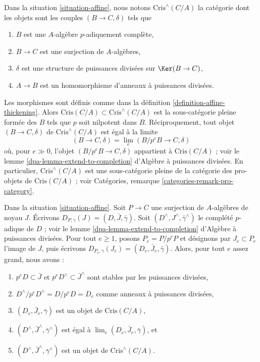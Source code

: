 \begin{remark}
\label{remark-completed-affine-site}
Dans la situation \ref{situation-affine}, nous notons
$\text{Cris}^\wedge(C/A)$ la catégorie dont les objets sont
les couples $(B \to C, \delta)$ tels que
\begin{enumerate}
\item $B$ est une $A$-algèbre $p$-adiquement complète,
\item $B \to C$ est une surjection de $A$-algèbres,
\item $\delta$ est une structure de puissances divisées sur $\Ker(B \to C)$,
\item $A \to B$ est un homomorphisme d'anneaux à puissances divisées.
\end{enumerate}
Les morphismes sont définis comme dans la définition \ref{definition-affine-thickening}.
Alors $\text{Cris}(C/A) \subset \text{Cris}^\wedge(C/A)$ est la sous-catégorie
pleine formée des $B$ tels que $p$ soit nilpotent dans $B$.
Réciproquement, tout objet $(B \to C, \delta)$ de $\text{Cris}^\wedge(C/A)$
est égal à la limite
$$
(B \to C, \delta) = \lim_e (B/p^eB \to C, \delta)
$$
où, pour $e \gg 0$, l'objet $(B/p^eB \to C, \delta)$ appartient
à $\text{Cris}(C/A)$ ; voir le
lemme \ref{dpa-lemma-extend-to-completion} d'Algèbre à puissances divisées.
En particulier, $\text{Cris}^\wedge(C/A)$ est une sous-catégorie pleine
de la catégorie des pro-objets de $\text{Cris}(C/A)$ ; voir
Catégories, remarque \ref{categories-remark-pro-category}.
\end{remark}

\begin{lemma}
\label{lemma-list-properties}
Dans la situation \ref{situation-affine}.
Soit $P \to C$ une surjection de $A$-algèbres de noyau $J$.
Écrivons $D_{P, \gamma}(J) = (D, \bar J, \bar\gamma)$.
Soit $(D^\wedge, J^\wedge, \bar\gamma^\wedge)$ le
complété $p$-adique de $D$ ; voir le
lemme \ref{dpa-lemma-extend-to-completion} d'Algèbre à puissances divisées.
Pour tout $e \geq 1$, posons $P_e = P/p^eP$ et désignons par $J_e \subset P_e$
l'image de $J$, puis écrivons
$D_{P_e, \gamma}(J_e) = (D_e, \bar J_e, \bar\gamma)$.
Alors, pour tout $e$ assez grand, nous avons :
\begin{enumerate}
\item $p^eD \subset \bar J$ et $p^eD^\wedge \subset \bar J^\wedge$
sont stables par les puissances divisées,
\item $D^\wedge/p^eD^\wedge = D/p^eD = D_e$ comme anneaux à puissances divisées,
\item $(D_e, \bar J_e, \bar\gamma)$ est un objet de $\text{Cris}(C/A)$,
\item $(D^\wedge, \bar J^\wedge, \bar\gamma^\wedge)$ est égal à
$\lim_e (D_e, \bar J_e, \bar\gamma)$, et
\item $(D^\wedge, \bar J^\wedge, \bar\gamma^\wedge)$ est un objet de
$\text{Cris}^\wedge(C/A)$.
\end{enumerate}
\end{lemma}

